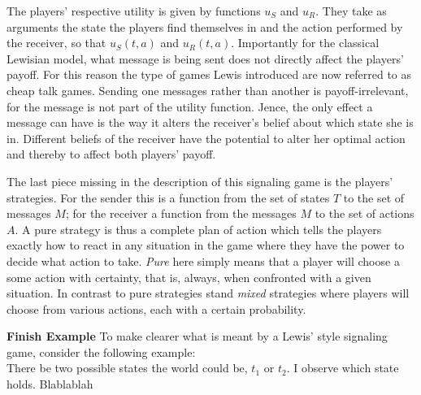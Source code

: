 \documentclass{article}
\begin{document}
The players' respective utility is given by functions $u_S$ and $u_R$. They take as arguments the state the players find themselves in and the action performed by the receiver, so that $u_S(t,a)$ and $u_R(t,a)$. Importantly for the classical Lewisian model, what message is being sent does not directly affect the players' payoff. For this reason the type of games Lewis introduced are now referred to as cheap talk games. Sending one messages rather than another is payoff-irrelevant, for the message is not part of the utility function. Jence, the only effect a message can have is the way it alters the receiver's belief about which state she is in. Different beliefs of the receiver have the potential to alter her optimal action and thereby to affect both players' payoff.

The last piece missing in the description of this signaling game is the players' strategies. For the sender this is a function from the set of states $T$ to the set of messages $M$; for the receiver a function from the messages $M$ to the set of actions $A$. A pure strategy is thus a complete plan of action which tells the players exactly how to react in any situation in the game where they have the power to decide what action to take. \textit{Pure} here simply means that a player will choose a some action with certainty, that is, always, when confronted with a given situation. In contrast to pure strategies stand \textit{mixed} strategies where players will choose from various actions, each with a certain probability.

\textbf{Finish Example}
To make clearer what is meant by a Lewis' style signaling game, consider the following example:\\
There be two possible states the world could be, $t_1$ or $t_2$. I observe which state holds. Blablablah
\end{document}
